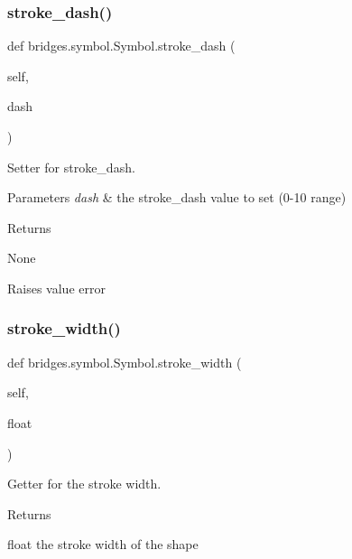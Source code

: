 \subsubsection{\texorpdfstring{stroke\+\_\+dash()}{stroke\_dash()}\hspace{0.1cm}{\footnotesize\ttfamily [2/2]}}
{\footnotesize\ttfamily def bridges.\+symbol.\+Symbol.\+stroke\+\_\+dash (\begin{DoxyParamCaption}\item[{}]{self,  }\item[{}]{dash }\end{DoxyParamCaption})}



Setter for stroke\+\_\+dash. 


\begin{DoxyParams}{Parameters}
{\em dash} & the stroke\+\_\+dash value to set (0-\/10 range) \\
\hline
\end{DoxyParams}
\begin{DoxyReturn}{Returns}


None 

Raises value error 
\end{DoxyReturn}
\mbox{\label{classbridges_1_1symbol_1_1_symbol_a4da625974fcb3ac83a60489a7c059c10}} 
\subsubsection{\texorpdfstring{stroke\+\_\+width()}{stroke\_width()}\hspace{0.1cm}{\footnotesize\ttfamily [1/2]}}
{\footnotesize\ttfamily def bridges.\+symbol.\+Symbol.\+stroke\+\_\+width (\begin{DoxyParamCaption}\item[{}]{self,  }\item[{}]{float }\end{DoxyParamCaption})}



Getter for the stroke width. 

\begin{DoxyReturn}{Returns}


float the stroke width of the shape 
\end{DoxyReturn}
\mbox{\label{classbridges_1_1symbol_1_1_symbol_a85c961221005786cd8f5b31fec3fd8d2}} 
